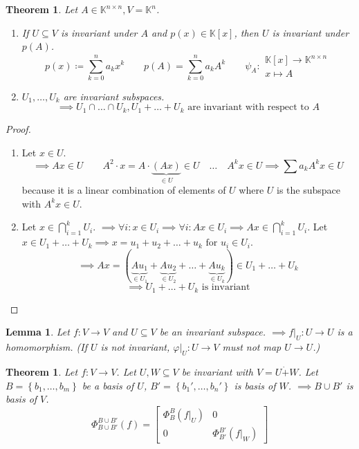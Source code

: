 \documentclass[a4paper]{article}
\newcounter{lecref}[section]
\numberwithin{lecref}{section}
\newtheorem{theorem}[lecref]{Theorem}
\newtheorem{lemma}[lecref]{Lemma}
\newcommand{\set}[1]{\left\{#1\right\}}
\begin{document}
\begin{theorem} %
  \label{s113}
  Let $A \in \mathbb K^{n\times n}, V = \mathbb K^n$.
  \begin{enumerate}
    \item If $U \subseteq V$ is invariant under $A$ and $p(x) \in \mathbb K[x]$, then $U$ is invariant under $p(A)$.
      \[
        p(x) \coloneqq \sum_{k=0}^n a_k x^k 
        \qquad p(A) = \sum_{k=0}^n a_k A^k
        \qquad \psi_A: \substack{\mathbb K[x] \to \mathbb K^{n\times n} \\ x \mapsto A}
      \]
    \item $U_1, \dots, U_k$ are invariant subspaces.
      \[ \implies U_1 \cap \dots \cap U_k, U_1 + \dots + U_k \text{ are invariant with respect to } A \]
  \end{enumerate}
\end{theorem}

\begin{proof}
  \begin{enumerate}
    \item Let $x \in U$.
      \[ \implies Ax \in U \qquad A^2 \cdot x = A \cdot \underbrace{(Ax)}_{\in U} \in U \quad \dots \quad A^k x \in U \implies \sum a_k A^k x \in U \]
      because it is a linear combination of elements of $U$ where $U$ is the subspace with $A^k x \in U$.
    \item Let $x \in \bigcap_{i=1}^k U_i$. $\implies \forall i: x \in U_i \implies \forall i: Ax \in U_i \implies Ax \in \bigcap_{i=1}^k U_i$.
      Let $x \in U_1 + \dots + U_k \implies x = u_1 + u_2 + \dots + u_k \text{ for } u_i \in U_i$.
      \[ \implies Ax = (\underbrace{Au_1}_{\in U_1} + \underbrace{Au_2}_{\in U_2} + \dots + \underbrace{Au_k}_{\in U_k}) \in U_1 + \dots + U_k \]
      \[ \implies U_1 + \dots + U_k \text{ is invariant} \]
  \end{enumerate}
\end{proof}

\begin{lemma} %
  Let $f: V \to V$ and $U \subseteq V$ be an invariant subspace.
  $\implies f|_U: U \to U$ is a homomorphism.
  (If $U$ is not invariant, $\varphi|_U: U \to V$ must not map $U \to U$.)
\end{lemma}

\begin{theorem} %
  Let $f: V \to V$. Let $U, W \subseteq V$ be invariant with $V = U \dot+ W$.
  Let $B = \set{b_1, \dots, b_m}$ be a basis of $U$, $B' = \set{b_1', \dots, b_n'}$ is basis of $W$.
  $\implies B \cup B'$ is basis of $V$.
  \[
    \Phi_{B\cup B'}^{B\cup B'}(f) = \left[\begin{array}{c|c}
      \Phi_B^B(f|_U) & 0 \\
    \hline
      0 & \Phi_{B'}^{B'}(f|_W)
    \end{array}\right]
  \]
\end{theorem}
\end{document}
